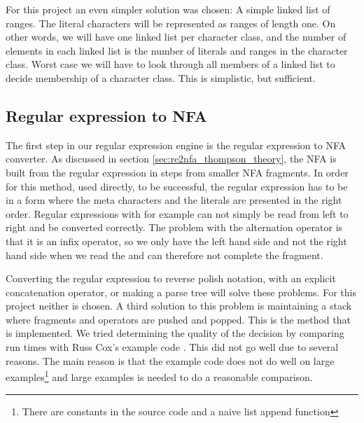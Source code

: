 For this project an even simpler solution was chosen: A simple linked
list of ranges. The literal characters will be represented as ranges
of length one. On other words, we will have one linked list per
character class, and the number of elements in each linked list is the
number of literals and ranges in the character class. Worst case we
will have to look through all members of a linked list to decide
membership of a character class. This is simplistic, but sufficient.


\subsection{Regular expression to NFA}

The first step in our regular expression engine is the regular
expression to NFA converter. As discussed in section
\vref{sec:re2nfa_thompson_theory}, the NFA is built from the regular
expression in steps from smaller NFA fragments. In order for this
method, used directly, to be successful, the regular expression has to
be in a form where the meta characters and the literals are presented
in the right order. Regular expressions with for example
\textsf{\textbar} can not simply be read from left to right and be
converted correctly. The problem with the alternation operator is that
it is an infix operator, so we only have the left hand side and not
the right hand side when we read the \textsf{\textbar} and can
therefore not complete the fragment.

Converting the regular expression to reverse polish notation, with an
explicit concatenation operator, or making a parse tree will solve
these problems. For this project neither is chosen. A third solution
to this problem is maintaining a stack where fragments and operators
are pushed and popped. This is the method that is implemented. We
tried determining the quality of the decision by comparing run times
with Russ Cox's example code \cite{Cox2007}. This did not go well due
to several reasons. The main reason is that the example code does not
do well on large examples\footnote{There are constants in the source
  code and a naive list append function} and large examples is needed
to do a reasonable comparison.


